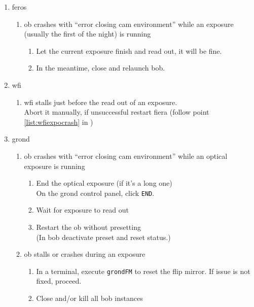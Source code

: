 \documentclass[11pt,fleqn,a4paper]{book}
\begin{document}
\begin{enumerate}
  \item \gls{feros} 
    \begin{enumerate}
       \item \gls{ob} crashes with ``error closing cam environment''
          while an exposure (usually the first of the night) is running
          \begin{enumerate}
            \item Let the current exposure finish and read out, it will be fine.
            \item In the meantime, close and relaunch \gls{bob}.
          \end{enumerate}
    \end{enumerate}
  \item \gls{wfi}
    \begin{enumerate}
       \item \gls{wfi} \gls{stall}s just before the read out of an exposure.\\
             Abort it manually, if unsuccessful restart \gls{fiera} (follow point \ref{list:wfiexpocrash} in )
    \end{enumerate}
  \item \gls{grond}
    \begin{enumerate}
       \item \gls{ob} crashes with ``error closing cam environment''
          while an optical exposure is running
          \begin{enumerate}
            \item End the optical exposure (if it's a long one)\\
                  On the grond control panel, click \texttt{END}.
            \item Wait for exposure to read out
            \item Restart the \gls{ob} without \gls{preset}ting\\
                  (In \gls{bob} deactivate preset and reset status.)
          \end{enumerate}
       \item \gls{ob} \gls{stall}s or crashes during an exposure
	      \begin{enumerate}
             \item In a terminal, execute \texttt{grondFM} to reset the \gls{flip mirror}. If issue is not fixed, proceed.
             \item Close and/or kill all {bob} instances\\

\end{enumerate}
\end{enumerate}
\end{enumerate}
\end{document}
